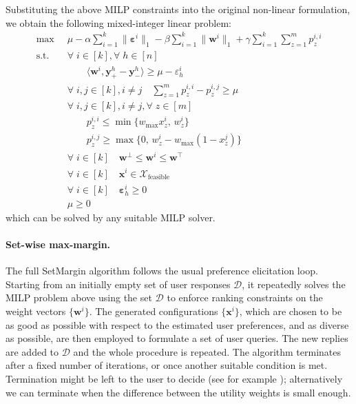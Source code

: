 \documentclass{article}
\renewcommand\[{\begin{equation}}
\renewcommand\]{\end{equation}}
\newcommand{\calvar}[1]{\ensuremath{\mathcal{#1}}}
\newcommand{\calD}{\calvar{D}}
\newcommand{\calX}{\calvar{X}}
\newcommand{\vecvar}[1]{\ensuremath{\boldsymbol{#1}}}
\newcommand{\vw}{\vecvar{w}}
\newcommand{\vx}{\vecvar{x}}
\newcommand{\vy}{\vecvar{y}}
\newcommand{\veps}{\vecvar{\varepsilon}}
\newcommand{\andrea}[1]{{\bf \textcolor{blue}{{\fbox{Andrea:} #1}}}}
\begin{document}
Substituting the above MILP constraints into the original non-linear
formulation, we obtain the following mixed-integer linear problem:
%
{\footnotesize
\begin{align}
    \max
        & \;\; \mu - \alpha \sum_{i=1}^k \| \veps^{i} \|_1 - \beta \sum_{i=1}^k \| \vw^{i} \|_1 + \gamma \sum_{i=1}^k \sum_{z=1}^m p^{i,i}_z
        \nonumber
    \\
    \text{s.t.}
        & \;\; \forall \; i \in [k], \forall \; h \in [n] \nonumber
    \\
        & \;\; \qquad \langle \vw^{i}, \vy^{h}_+ - \vy^{h}_- \rangle \ge \mu - \varepsilon^{i}_h \nonumber
    \\
        & \;\; \forall \; i, j \in [k], i \neq j \quad \sum_{z=1}^m p^{i,i}_z - p^{i,j}_z \ge \mu
    \\
        & \;\; \forall \; i, j \in [k], i \neq j, \forall \; z \in [m] \nonumber
    \\
        & \;\; \qquad p^{i,i}_z \le \min \{ w_\text{max} x^{i}_z, \, w^{i}_z \}
    \\
        & \;\; \qquad p^{i,j}_z \ge \max \{ 0, \, w^{i}_z - w_\text{max}(1 - x^{j}_z) \}
    \\
        & \;\; \forall \; i \in [k] \quad \vw^\bot \le \vw^{i} \le \vw^\top \label{eq:wbounds2}
    \\
        & \;\; \forall \; i \in [k] \quad \vx^{i} \in \calX_{\text{feasible}} \nonumber
    \\
        & \;\; \forall \; i \in [k] \quad \veps^{i}_h \ge 0 \nonumber
    \\
        & \;\; \mu \ge 0 \nonumber
\end{align}
}
%
which can be solved by any suitable MILP solver.

\paragraph{Set-wise max-margin.} The full {\sc SetMargin} algorithm
follows the usual preference elicitation loop. Starting from an
initially empty set of user responses $\calD$, it repeatedly solves
the MILP problem above using the set $\calD$ to enforce ranking
constraints on the weight vectors $\{\vw^i\}$. The generated
configurations $\{\vx^i\}$, which are chosen to be as good as possible
with respect to the estimated user preferences, and as diverse as
possible, are then employed to formulate a set of user queries. The
new replies are added to $\calD$ and the whole procedure is
repeated. The algorithm terminates after a fixed number of iterations,
or once another suitable condition is met. 
Termination might be left to the user to decide (see for example \cite{Reilly2007}); 
alternatively we can terminate when the difference between the utility weights is small enough.
\end{document}
